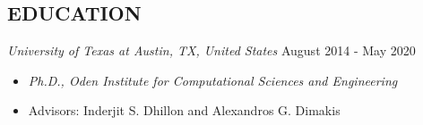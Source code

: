 \documentclass[margin, 10pt]{res} %
\begin{document}
\begin{resume}

 






\section{EDUCATION}

{\sl University of Texas at Austin, TX, United States} \hfill August 2014 - May 2020
\begin{itemize}
\item {\sl Ph.D., Oden Institute for Computational Sciences and Engineering} 
\item Advisors: Inderjit S. Dhillon and Alexandros 
  G. Dimakis  
\end{itemize} 



\end{resume}
\end{document}
